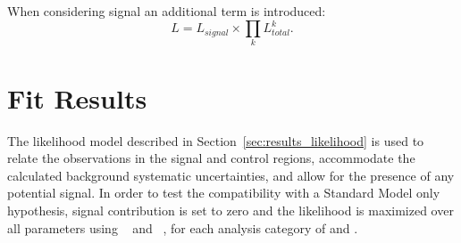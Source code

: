 When considering signal an additional term is introduced:
% 
\begin{equation}
L = L_{signal} \times \prod_k L^k_{total} .
\label{eq:total_likelihood_wsignal}
\end{equation}
% 







\section{Fit Results}  %
\label{sec:results_fit}
The likelihood model described in Section~\ref{sec:results_likelihood} is used
to relate the observations in the signal and control regions, accommodate the
calculated background systematic uncertainties, and allow for the presence of
any potential signal. In order to test the compatibility with a Standard
Model only hypothesis, signal contribution is set to zero and the likelihood is
maximized over all parameters using \ROOFIT~\cite{roofit} and
\MINUIT~\cite{James:1975dr}, for each analysis category of \nb and \nj.

